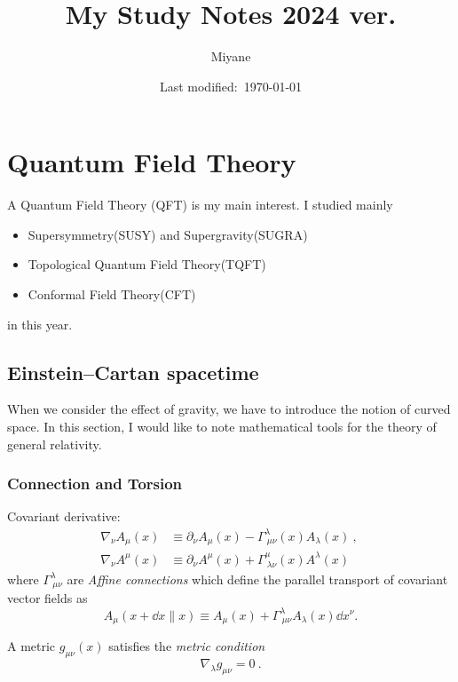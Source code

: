 \documentclass[a4paper,pdftex]{report}
\title{My Study Notes 2024 ver.}
\author{Miyane}
\date{Last modified:\ \today}
\begin{document}
\maketitle

\tableofcontents

\clearpage

\chapter{Quantum Field Theory}

A Quantum Field Theory (QFT) is my main interest. I studied mainly
\begin{itemize}
  \item 
  Supersymmetry(SUSY) and Supergravity(SUGRA)
  \item 
  Topological Quantum Field Theory(TQFT)
  \item 
  Conformal Field Theory(CFT)
\end{itemize}
in this year.

\section{Einstein–Cartan spacetime}

When we consider the effect of gravity, we have to introduce the notion of curved space. In this section, I would like to note mathematical tools for the theory of general relativity.

\subsection{Connection and  Torsion}

Covariant derivative:
\begin{align}
  \nabla_{\nu}A_{\mu}(x)
  &\equiv
  \partial_{\nu}A_{\mu}(x)
  -
  \Gamma^{\lambda}_{\ \mu\nu}(x)A_{\lambda}(x)
  \ ,\ 
  \\
  \nabla_{\nu}A^{\mu}(x)
  &\equiv
  \partial_{\nu}A^{\mu}(x)
  +
  \Gamma^{\mu}_{\ \lambda\nu}(x)A^{\lambda}(x)
\end{align}
where $\Gamma^{\lambda}_{\ \mu\nu}$ are \textit{Affine connections} which define the parallel transport of covariant vector fields as
\begin{equation}
  A_{\mu}(x+\dd x \parallel x)
  \equiv
  A_{\mu}(x)
  +
  \Gamma^{\lambda}_{\ \mu\nu}A_{\lambda}(x)\dd x^{\nu}
  .
\end{equation}

A metric $g_{\mu\nu}(x)$ satisfies the \textit{metric condition}
\begin{equation}
  \nabla_{\lambda}g_{\mu\nu}
  =
  0
  \ .
\end{equation}
\end{document}
